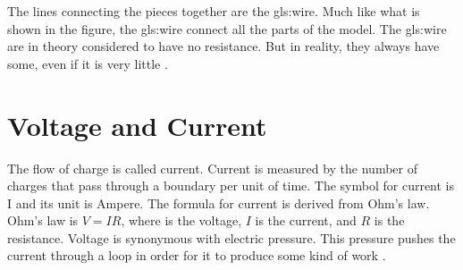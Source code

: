 \documentclass[class={myRUCProject}, crop=false]{standalone}
\begin{document}
The lines connecting the pieces together are the \gls{gls:wire}. Much like what is shown in the figure, the \gls{gls:wire} connect all the parts of the model. The \gls{gls:wire} are in theory considered to have no resistance. But in reality, they always have some, even if it is very little \cite{}. 


 \section{Voltage and Current}
The flow of charge is called current. Current is measured by the number of charges that pass through a boundary per unit of time. The symbol for current is I and its unit is Ampere. The formula for current is derived from Ohm's law. Ohm's law is \(V=IR\), where  is the voltage, \(I\) is the current, and \(R\) is the resistance. Voltage is synonymous with electric pressure. This pressure pushes the current through a loop in order for it to produce some kind of work \cite{}. 




\end{document}
